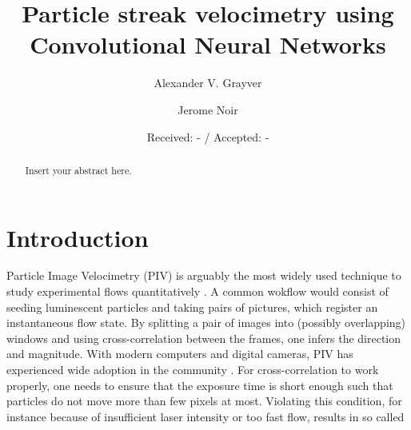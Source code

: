 \documentclass{svjour3}                     %
\begin{document}
\title{Particle streak velocimetry using Convolutional Neural Networks}

\author{Alexander V. Grayver         \and
        Jerome Noir
}


\date{Received: - / Accepted: -}


\maketitle

\begin{abstract}
Insert your abstract here. 
\end{abstract}

\section{Introduction}
\label{intro}

Particle Image Velocimetry (PIV) is arguably the most widely used technique to study experimental flows quantitatively \cite{raffel2018particle}. A common wokflow would consist of seeding luminescent particles and taking pairs of pictures, which register an instantaneous flow state. By splitting a pair of images into (possibly overlapping) windows and using cross-correlation between the frames, one infers the direction and magnitude. With modern computers and digital cameras, PIV has experienced wide adoption in the community \cite{JN}. For cross-correlation to work properly, one needs to ensure that the exposure time is short enough such that particles do not move more than few pixels at most. Violating this condition, for instance because of insufficient laser intensity or too fast flow, results in so called 
\end{document}
